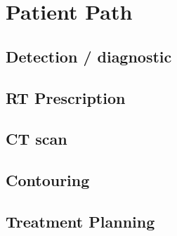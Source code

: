 




\section{Patient Path}

\subsection{Detection / diagnostic}
\subsection{RT Prescription}
\subsection{CT scan}
\subsection{Contouring}
\subsection{Treatment Planning}
